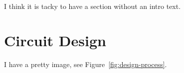 I think it is tacky to have a section without an intro text.

\section{Circuit Design}

I have a pretty image, see Figure~\ref{fig:design-process}.


